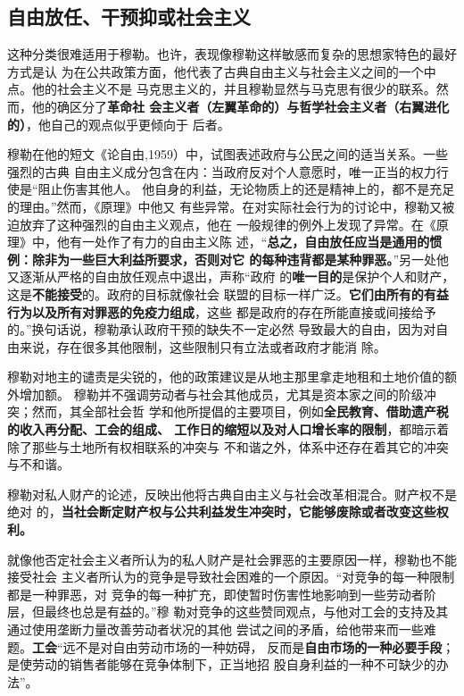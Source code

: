 \subsection{自由放任、干预抑或社会主义}

这种分类很难适用于穆勒。也许，表现像穆勒这样敏感而复杂的思想家特色的最好方式是认
为在公共政策方面，他代表了古典自由主义与社会主义之间的一个中点。他的社会主义不是
马克思主义的，并且穆勒显然与马克思有很少的联系。然而，他的确区分了\textbf{革命社
  会主义者（左翼革命的）与哲学社会主义者（右翼进化的）}，他自己的观点似乎更倾向于
后者。

穆勒在他的短文《论自由,1959）中，试图表述政府与公民之间的适当关系。一些强烈的古典
自由主义成分包含在内：当政府反对个人意愿时，唯一正当的权力行使是“阻止伤害其他人。
他自身的利益，无论物质上的还是精神上的，都不是充足的理由。”然而，《原理》中他又
有些异常。在对实际社会行为的讨论中，穆勒又被迫放弃了这种强烈的自由主义观点，他在
一般规律的例外上发现了异常。在《原理》中，他有一处作了有力的自由主义陈
述，“\textbf{总之，自由放任应当是通用的惯例：除非为一些巨大利益所要求，否则对它
  的每种违背都是某种罪恶。}”另一处他又逐渐从严格的自由放任观点中退出，声称“政府
的\textbf{唯一目的}是保护个人和财产，这是\textbf{不能接受}的。政府的目标就像社会
联盟的目标一样广泛。\textbf{它们由所有的有益行为以及所有对罪恶的免疫力组成}，这些
都是政府的存在所能直接或间接给予的。”换句话说，穆勒承认政府干预的缺失不一定必然
导致最大的自由，因为对自由来说，存在很多其他限制，这些限制只有立法或者政府才能消
除。

穆勒对地主的谴责是尖锐的，他的政策建议是从地主那里拿走地租和土地价值的额外增加额。
穆勒并不强调劳动者与社会其他成员，尤其是资本家之间的阶级冲突；然而，其全部社会哲
学和他所提倡的主要项目，例如\textbf{全民教育、借助遗产税的收入再分配、工会的组成、
  工作日的缩短以及对人口增长率的限制}，都暗示着除了那些与土地所有权相联系的冲突与
不和谐之外，体系中还存在着其它的冲突与不和谐。

穆勒对私人财产的论述，反映出他将古典自由主义与社会改革相混合。财产权不是绝对
的，\textbf{当社会断定财产权与公共利益发生冲突时，它能够废除或者改变这些权利。}

就像他否定社会主义者所认为的私人财产是社会罪恶的主要原因一样，穆勒也不能接受社会
主义者所认为的竞争是导致社会困难的一个原因。“对竞争的每一种限制都是一种罪恶，对
竞争的每一种扩充，即使暂时伤害性地影响到一些劳动者阶层，但最终也总是有益的。”穆
勒对竞争的这些赞同观点，与他对工会的支持及其通过使用垄断力量改善劳动者状况的其他
尝试之间的矛盾，给他带来而一些难题。\textbf{工会}“远不是对自由劳动市场的一种妨碍，
反而是\textbf{自由市场的一种必要手段}；是使劳动的销售者能够在竞争体制下，正当地招
股自身利益的一种不可缺少的办法”。

